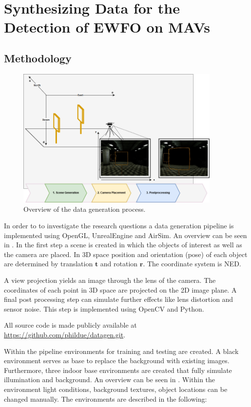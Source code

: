\chapter{Synthesizing Data for the Detection of \ac{EWFO} on \acp{MAV}}


\section{Methodology}
\begin{figure}[htbp]
	\centering
	\includegraphics[width=0.9\textwidth]{fig/datagen_notation}
	\caption{Overview of the data generation process.}
	\label{fig:training:datagen_notation}
\end{figure}

In order to to investigate the research questions a data generation pipeline is implemented using OpenGL, UnrealEngine and AirSim. An overview can be seen in . In the first step a scene is created in which the objects of interest as well as the camera are placed. In 3D space position and orientation (pose) of each object are determined by translation $\textbf{t}$ and rotation $\textbf{r}$. The coordinate system is \ac{NED}.

A view projection yields an image through the lens of the camera. The coordinates of each point in 3D space are projected on the 2D image plane. A final post processing step can simulate further effects like lens distortion and sensor noise. This step is implemented using OpenCV and Python.

All source code is made publicly available at \url{https://github.com/phildue/datagen.git}.

Within the pipeline environments for training and testing are created. A black environment serves as base to replace the background with existing images. Furthermore, three indoor base environments are created that fully simulate illumination and background. An overview can be seen in . Within the environment light conditions, background textures, object locations can be changed manually. The environments are described in the following:

